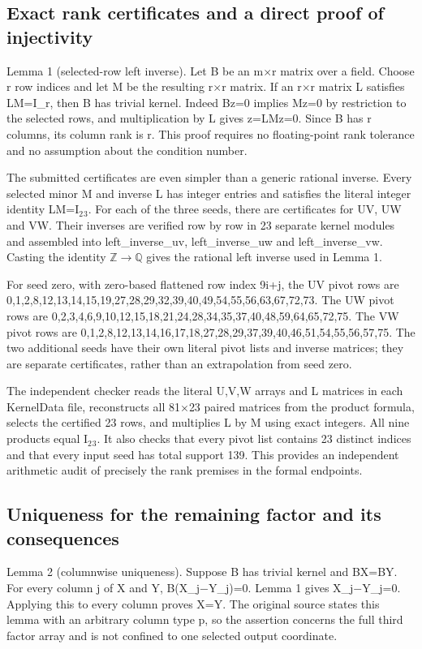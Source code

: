 \documentclass[11pt,a4paper]{article}
\begin{document}
\subsection{Exact rank certificates and a direct proof of injectivity}
Lemma 1 (selected-row left inverse). Let B be an m\ensuremath{\times}r matrix over a field. Choose r row indices and let M be the resulting r\ensuremath{\times}r matrix. If an r\ensuremath{\times}r matrix L satisfies LM=I\_r, then B has trivial kernel. Indeed Bz=0 implies Mz=0 by restriction to the selected rows, and multiplication by L gives z=LMz=0. Since B has r columns, its column rank is r. This proof requires no floating-point rank tolerance and no assumption about the condition number.

The submitted certificates are even simpler than a generic rational inverse. Every selected minor M and inverse L has integer entries and satisfies the literal integer identity LM=I\ensuremath{_2}\ensuremath{_3}. For each of the three seeds, there are certificates for UV, UW and VW. Their inverses are verified row by row in 23 separate kernel modules and assembled into left\_inverse\_uv, left\_inverse\_uw and left\_inverse\_vw. Casting the identity \ensuremath{\mathbb{Z}}\ensuremath{\to}\ensuremath{\mathbb{Q}} gives the rational left inverse used in Lemma 1.

For seed zero, with zero-based flattened row index 9i+j, the UV pivot rows are 0,1,2,8,12,13,14,15,19,27,28,29,32,39,40,49,54,55,56,63,67,72,73. The UW pivot rows are 0,2,3,4,6,9,10,12,15,18,21,24,28,34,35,37,40,48,59,64,65,72,75. The VW pivot rows are 0,1,2,8,12,13,14,16,17,18,27,28,29,37,39,40,46,51,54,55,56,57,75. The two additional seeds have their own literal pivot lists and inverse matrices; they are separate certificates, rather than an extrapolation from seed zero.

The independent checker reads the literal U,V,W arrays and L matrices in each KernelData file, reconstructs all 81\ensuremath{\times}23 paired matrices from the product formula, selects the certified 23 rows, and multiplies L by M using exact integers. All nine products equal I\ensuremath{_2}\ensuremath{_3}. It also checks that every pivot list contains 23 distinct indices and that every input seed has total support 139. This provides an independent arithmetic audit of precisely the rank premises in the formal endpoints.

\subsection{Uniqueness for the remaining factor and its consequences}
Lemma 2 (columnwise uniqueness). Suppose B has trivial kernel and BX=BY. For every column j of X and Y, B(X\_j\ensuremath{-}Y\_j)=0. Lemma 1 gives X\_j\ensuremath{-}Y\_j=0. Applying this to every column proves X=Y. The original source states this lemma with an arbitrary column type p, so the assertion concerns the full third factor array and is not confined to one selected output coordinate.
\end{document}
